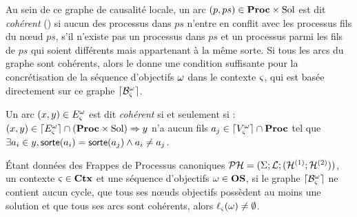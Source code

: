 Au sein de ce graphe de causalité locale, un arc $(p, ps) \in \mathbf{Proc} \times \mathrm{Sol}$
est dit \emph{cohérent} () si aucun des processus dans $ps$
n'entre en conflit avec les processus fils du nœud $ps$,
\cad s'il n'existe pas un processus dans $ps$ et un processus parmi les fils de $ps$
qui soient différents mais appartenant à la même sorte.
Si tous les arcs du graphe sont cohérents, alors le 
donne une condition suffisante pour la concrétisation de la séquence d'objectifs $\omega$
dans le contexte $\varsigma$, qui est basée directement sur ce graphe $\lceil \mathcal{B}_\varsigma^\omega\rceil$.

\begin{definition}
  Un arc $(x, y) \in E_\varsigma^\omega$ est dit \emph{cohérent} si et seulement si :
  $(x, y) \in \lceil E_\varsigma^\omega\rceil \cap (\mathbf{Proc} \times \mathrm{Sol}) \Rightarrow y$ n'a aucun fils $a_j \in \lceil V_\varsigma^\omega\rceil \cap \mathbf{Proc}$
  tel que $\exists a_i \in y, \mathsf{sorte}(a_i) = \mathsf{sorte}(a_j) \wedge a_i \neq a_j$.
\end{definition}

\begin{theorem}
  Étant données des Frappes de Processus canoniques $\mathcal{PH} = (\Sigma; \mathcal{L}; (\mathcal{H}^{(1)};\mathcal{H}^{(2)}))$,
  un contexte $\varsigma \in \mathbf{Ctx}$ et une séquence d'objectifs $\omega \in \mathbf{OS}$,
  si le graphe $\lceil \mathcal{B}_\varsigma^\omega\rceil$ ne contient aucun cycle,
  que tous ses nœuds objectifs possèdent au moins une solution
  et que tous ses arcs sont cohérents,
  alors $\ell_\varsigma(\omega) \neq \emptyset$.
\end{theorem}





%


